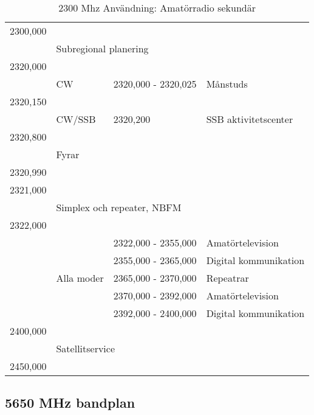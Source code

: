 \setlongtables
\begin{longtable}{llll}
\caption{2300 Mhz Användning: Amatörradio sekundär} \\

2300,000 & & & \\
         & \multicolumn{3}{l}{Subregional planering} \\
2320,000 & & & \\
         & CW     & 2320,000 - 2320,025 & Månstuds \\
2320,150 & & & \\
         & CW/SSB & 2320,200            & SSB aktivitetscenter \\
2320,800 & & & \\
         & Fyrar & & \\
2320,990 & & & \\
2321,000 & & & \\
         & \multicolumn{3}{l}{Simplex och repeater, NBFM} \\
2322,000 & & & \\
         &            & 2322,000 - 2355,000 & Amatörtelevision \\
         &            & 2355,000 - 2365,000 & Digital kommunikation \\
         & Alla moder & 2365,000 - 2370,000 & Repeatrar \\
         &            & 2370,000 - 2392,000 & Amatörtelevision \\
         &            & 2392,000 - 2400,000 & Digital kommunikation \\
2400,000 & & & \\
         & \multicolumn{3}{l}{Satellitservice} \\
2450,000 & & & \\
\end{longtable}

\subsection{5650 MHz bandplan}

